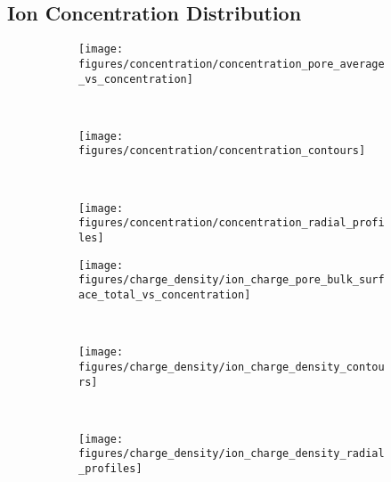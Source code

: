 \documentclass[journal=ancac3,manuscript=article,etalmode=truncate,maxauthors=0,layout=onecolumn]{achemso}
\begin{document}

\subsection{Ion Concentration Distribution}\label{sec:ionc}
%

\begin{figure}[!htb]
  \centering
  \begin{minipage}[t]{8cm}
    \begin{subfigure}[t]{8cm}
      \centering
      \caption{}\vspace{-3mm}\label{fig:concentration_pore_average_vs_cbulk}
      \texttt{[image: figures/concentration/concentration\_pore\_average\_vs\_concentration]}
    \end{subfigure}
    \\
    \begin{subfigure}[t]{8cm}
      \centering
      \caption{}\vspace{-3mm}\label{fig:concentration_contours}
      \texttt{[image: figures/concentration/concentration\_contours]}
    \end{subfigure}
    \\
    \begin{subfigure}[t]{8cm}
      \centering
      \caption{}\vspace{-3mm}\label{fig:concentration_radial_profiles}
      \texttt{[image: figures/concentration/concentration\_radial\_profiles]}
    \end{subfigure}
  \end{minipage}
  \begin{minipage}[t]{8cm}
    \begin{subfigure}[t]{8cm}
      \centering
      \caption{}\vspace{-3mm}\label{fig:ion_charge_dist_vs_cbulk}
      \texttt{[image: figures/charge\_density/ion\_charge\_pore\_bulk\_surface\_total\_vs\_concentration]}
    \end{subfigure}
    \\
    \begin{subfigure}[t]{8cm}
      \centering
      \caption{}\vspace{-3mm}\label{fig:ion_scd_contours}
      \texttt{[image: figures/charge\_density/ion\_charge\_density\_contours]}
    \end{subfigure}
    \\
    \begin{subfigure}[t]{8cm}
      \centering
      \caption{}\vspace{-3mm}\label{fig:ion_scd_radial_profiles}
      \texttt{[image: figures/charge\_density/ion\_charge\_density\_radial\_profiles]}
    \end{subfigure}
  \end{minipage}


\end{figure}
\end{document}
